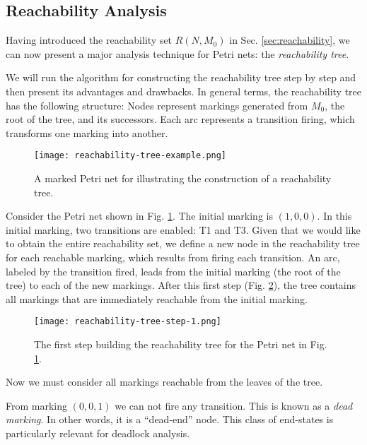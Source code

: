 \documentclass[../Thesis.tex]{subfiles}
\begin{document}
\subsection{Reachability Analysis}

Having introduced the reachability set $R(N, M_0)$ in Sec. \ref{sec:reachability},
we can now present a major analysis technique for Petri nets: the \emph{reachability tree}.

We will run the algorithm for constructing the reachability tree step by step
and then present its advantages and drawbacks.
In general terms, the reachability tree has the following structure:
Nodes represent markings generated from $M_0$, the root of the tree, and its successors.
Each arc represents a transition firing, which transforms one marking into another.

\begin{figure}[!htb]
    \centering
    \texttt{[image: reachability-tree-example.png]}
    \caption{A marked Petri net for illustrating the construction of a reachability tree.}
    \label{fig:reachability-tree-example}
\end{figure}

Consider the Petri net shown in Fig. \ref{fig:reachability-tree-example}.
The initial marking is $(1, 0, 0)$.
In this initial marking, two transitions are enabled: T1 and T3.
Given that we would like to obtain the entire reachability set,
we define a new node in the reachability tree for each reachable marking,
which results from firing each transition.
An arc, labeled by the transition fired, leads from the initial marking
(the root of the tree) to each of the new markings.
After this first step (Fig. \ref{fig:reachability-tree-step-1}),
the tree contains all markings that are immediately reachable from the initial marking.

\begin{figure}[!htb]
    \centering
    \texttt{[image: reachability-tree-step-1.png]}
    \caption{The first step building the reachability tree
        for the Petri net in Fig. \ref{fig:reachability-tree-example}.}
    \label{fig:reachability-tree-step-1}
\end{figure}

Now we must consider all markings reachable from the leaves of the tree.

From marking $(0,0,1)$ we can not fire any transition.
This is known as a \emph{dead marking}.
In other words, it is a ``dead-end'' node.
This class of end-states is particularly relevant for deadlock analysis.
\end{document}
